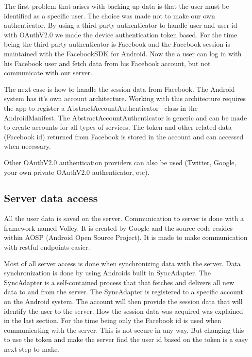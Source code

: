 The first problem that arises with backing up data is that the user must be identified as a specific user. The choice was made not to make our own authenticator. By using a third party authenticator to handle user and user id with OAuthV2.0 we made the device authentication token based. 
For the time being the third party authenticator is Facebook and the Facebook session is maintained with the FacebookSDK for Android. 
Now the a user can log in with his Facebook user and fetch data from his Facebook account, but not communicate with our server. 

The next case is how to handle the session data from Facebook. The Android system has it's own account architecture. Working with this architecture requires the app to register a AbstractAccountAuthenticator~\cite{androidAccount} class in the AndroidManifest. The AbstractAccountAuthenticator is generic and can be made to create accounts for all types of services. The token and other related data (Facebook id) returned from Facebook is stored in the account and can accessed when necessary.

Other OAuthV2.0 authentication providers can also be used (Twitter, Google, your own private OAuthV2.0 authenticator, etc). 


\subsection{Server data access}

All the user data is saved on the server. Communication to server is done with a framework named Volley. It is created by Google and the source code resides within AOSP (Android Open Source Project). It is made to make communication with restful endpoints easier.

Most of all server access is done when synchronizing data with the server. 
Data synchronization is done by using Androids built in SyncAdapter. The SyncAdapter is a self-contained process that that fetches and delivers all new data to and from the server. The SyncAdapter is registered to a specific account on the Android system. The account will then provide the session data that will identify the user to the server. How the session data was acquired was explained in the last section. For the time being only the Facebook id is used when communicating with the server. This is not secure in any way. But changing this to use the token and make the server find the user id based on the token is a easy next step to make.

